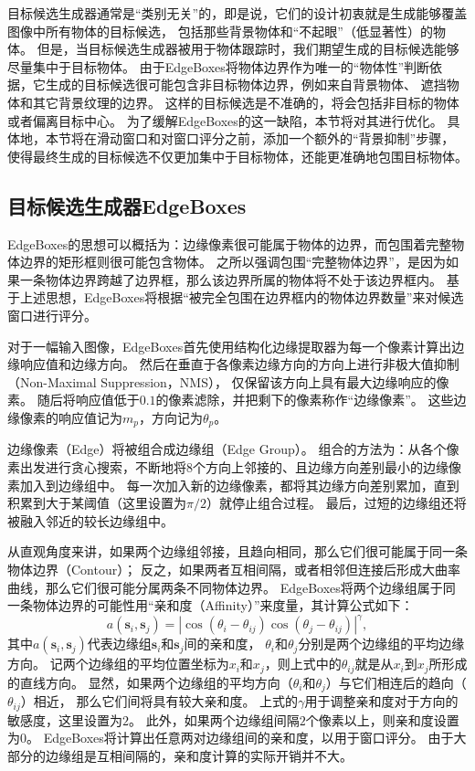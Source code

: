 目标候选生成器通常是``类别无关''的，即是说，它们的设计初衷就是生成能够覆盖图像中所有物体的目标候选，
包括那些背景物体和``不起眼''（低显著性）的物体。
但是，当目标候选生成器被用于物体跟踪时，我们期望生成的目标候选能够尽量集中于目标物体。
由于EdgeBoxes将物体边界作为唯一的``物体性''判断依据，它生成的目标候选很可能包含非目标物体边界，例如来自背景物体、
遮挡物体和其它背景纹理的边界。
这样的目标候选是不准确的，将会包括非目标的物体或者偏离目标中心。
为了缓解EdgeBoxes的这一缺陷，本节将对其进行优化。
具体地，本节将在滑动窗口和对窗口评分之前，添加一个额外的``背景抑制''步骤，
使得最终生成的目标候选不仅更加集中于目标物体，还能更准确地包围目标物体。

\subsection{目标候选生成器EdgeBoxes}
EdgeBoxes的思想可以概括为：边缘像素很可能属于物体的边界，而包围着完整物体边界的矩形框则很可能包含物体。
之所以强调包围``完整物体边界''，是因为如果一条物体边界跨越了边界框，那么该边界所属的物体将不处于该边界框内。
基于上述思想，EdgeBoxes将根据``被完全包围在边界框内的物体边界数量''来对候选窗口进行评分。

对于一幅输入图像，EdgeBoxes首先使用结构化边缘提取器为每一个像素计算出边缘响应值和边缘方向。
然后在垂直于各像素边缘方向的方向上进行非极大值抑制（Non-Maximal Suppression，NMS），
仅保留该方向上具有最大边缘响应的像素。
随后将响应值低于$0.1$的像素滤除，并把剩下的像素称作``边缘像素''。
这些边缘像素的响应值记为$m_p$，方向记为$\theta_p$。

边缘像素（Edge）将被组合成边缘组（Edge Group）。
组合的方法为：从各个像素出发进行贪心搜索，不断地将8个方向上邻接的、且边缘方向差别最小的边缘像素加入到边缘组中。
每一次加入新的边缘像素，都将其边缘方向差别累加，直到积累到大于某阈值（这里设置为$\pi/2$）就停止组合过程。
最后，过短的边缘组还将被融入邻近的较长边缘组中。

从直观角度来讲，如果两个边缘组邻接，且趋向相同，那么它们很可能属于同一条物体边界（Contour）；
反之，如果两者互相间隔，或者相邻但连接后形成大曲率曲线，那么它们很可能分属两条不同物体边界。
EdgeBoxes将两个边缘组属于同一条物体边界的可能性用``亲和度（Affinity）''来度量，其计算公式如下：
\begin{equation}
a(\textbf{s}_i,\textbf{s}_j)=|\cos(\theta_i-\theta_{ij})\cos(\theta_j-\theta_{ij})|^\gamma, \label{edge_affinity}
\end{equation}
其中$a(\textbf{s}_i,\textbf{s}_j)$代表边缘组$\textbf{s}_i$和$\textbf{s}_j$间的亲和度，
$\theta_{i}$和$\theta_{j}$分别是两个边缘组的平均边缘方向。
记两个边缘组的平均位置坐标为$x_i$和$x_j$，则上式中的$\theta_{ij}$就是从$x_i$到$x_j$所形成的直线方向。
显然，如果两个边缘组的平均方向（$\theta_{i}$和$\theta_{j}$）与它们相连后的趋向（$\theta_{ij}$）相近，
那么它们间将具有较大亲和度。
上式的$\gamma$用于调整亲和度对于方向的敏感度，这里设置为$2$。
此外，如果两个边缘组间隔$2$个像素以上，则亲和度设置为$0$。
EdgeBoxes将计算出任意两对边缘组间的亲和度，以用于窗口评分。
由于大部分的边缘组是互相间隔的，亲和度计算的实际开销并不大。

